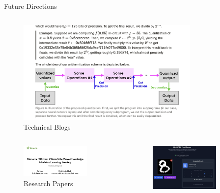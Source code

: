 \documentclass{zkdl-presentation-template}
\begin{document}
\begin{frame}{Future Directions}
\begin{columns}
                \begin{column}{0.5\textwidth}
                    \begin{figure}
                        \centering
                        \includegraphics[width=0.8\textwidth]{images/media_tech_blog.png}
                        \caption{Technical Blogs}
                    \end{figure}
                \end{column}
            \end{columns}
            \begin{columns}
                \begin{column}{0.5\textwidth}
                    \begin{figure}
                        \centering
                        \includegraphics[width=0.8\textwidth]{images/media_papers.png}
                        \caption{Research Papers}
                    \end{figure}
                \end{column}
                \begin{column}{0.5\textwidth}
                    \begin{figure}
                        \centering
                        \includegraphics[width=0.8\textwidth]{images/media_demos.png}

\end{figure}
\end{column}
\end{columns}
\end{frame}
\end{document}
